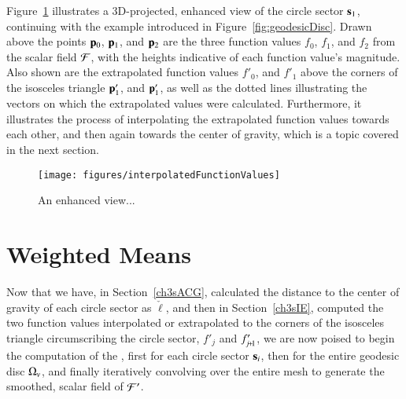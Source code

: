 Figure~\ref{fig:interpolatedFunctionValues} illustrates a 3D-projected, enhanced view of the circle sector $\mathbf{s}_1$, continuing with the example introduced in Figure~\ref{fig:geodesicDisc}. Drawn above the points $\mathbf{p}_0$, $\mathbf{p}_1$, and $\mathbf{p}_2$ are the three function values $f_0$, $f_1$, and $f_2$ from the scalar field $\mathcal{F}$, with the heights indicative of each function value's magnitude. Also shown are the extrapolated function values $f'_0$, and $f'_1$ above the corners of the isosceles triangle $\mathbf{p}'_1$, and $\mathbf{p}'_1$, as well as the dotted lines illustrating the vectors on which the extrapolated values were calculated. Furthermore, it illustrates the process of interpolating the extrapolated function values towards each other, and then again towards the center of gravity, which is a topic covered in the next section.

\begin{figure}[ht]
\ffigbox
	{\texttt{[image: figures/interpolatedFunctionValues]}}
	{\caption[Interpolation of Function Values toward the Center of Gravity]{An enhanced view...}\label{fig:interpolatedFunctionValues}}
\end{figure}

%
%
%
%
\section{Weighted Means}
\label{ch3sWM}
Now that we have, in Section~\ref{ch3sACG}, calculated the distance to the center of gravity of each circle sector as $\check{\ell}$, and then in Section~\ref{ch3sIE}, computed the two function values interpolated or extrapolated to the corners of the isosceles triangle circumscribing the circle sector, $f'_j$ and $f'_{\sjpo}$, we are now poised to begin the computation of the , first for each circle sector $\mathbf{s}_i$, then for the entire geodesic disc $\Omega_v$, and finally iteratively convolving  over the entire mesh to generate the smoothed, scalar field of  $\mathcal{F}'$.

